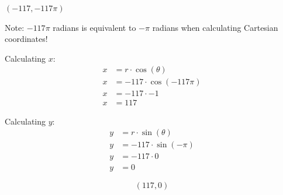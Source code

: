 \begin{problem}[26.]
    $( -117, -117\pi)$    
\end{problem}

\begin{solution}
    Note: $-117\pi$ radians is equivalent to $-\pi$ radians when calculating Cartesian coordinates! \medskip

    Calculating $x$:
    \begin{align}
        x &= r \cdot \cos(\theta) \\
        x &= -117 \cdot \cos \left( -117\pi \right) \\
        x &= -117 \cdot -1 \\
        x &= 117
    \end{align}
    
    Calculating $y$:
    \begin{align}
        y &= r \cdot \sin(\theta) \\
        y &= -117 \cdot \sin \left( -\pi \right) \\
        y &= -117 \cdot 0 \\
        y &= 0
    \end{align}
    
    \[\boxed{ (117, 0) }\]
\end{solution}